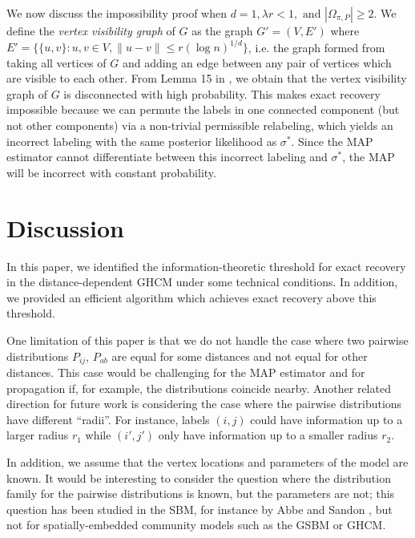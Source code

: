 \documentclass{article}
\newcommand{\1}{\mathbbm{1}}
\theoremstyle{definition}
\theoremstyle{plain}
\begin{document}
We now discuss the impossibility proof when $d = 1, \lambda r < 1, \text{ and } |\Omega_{\pi, P}| \geq 2$. We define the \textit{vertex visibility graph} of $G$ as the graph $G' = (V, E')$ where $E' = \{\{u, v\}: u,v \in V, \|u - v\| \leq r(\log n)^{1/d} \}$, i.e. the graph formed from taking all vertices of $G$ and adding an edge between any pair of vertices which are visible to each other. From Lemma 15 in \cite{GaudioJin2025}, we obtain that the vertex visibility graph of $G$ is disconnected with high probability. This makes exact recovery impossible because we can permute the labels in one connected component (but not other components) via a non-trivial permissible relabeling, which yields an incorrect labeling with the same posterior likelihood as $\sigma^*$. Since the MAP estimator cannot differentiate between this incorrect labeling and $\sigma^*$, the MAP will be incorrect with constant probability.

\section{Discussion}
\label{sec:discussion}
In this paper, we identified the information-theoretic threshold for exact recovery in the distance-dependent GHCM under some technical conditions. In addition, we provided an efficient algorithm which achieves exact recovery above this threshold.

One limitation of this paper is that we do not handle the case where two pairwise distributions $P_{ij}$, $P_{ab}$ are equal for some distances and not equal for other distances. This case would be challenging for the MAP estimator and for propagation if, for example, the distributions coincide nearby.
Another related direction for future work is considering the case where the pairwise distributions have different ``radii''. For instance, labels $(i, j)$ could have information up to a larger radius $r_1$ while $(i', j')$ only have information up to a smaller radius $r_2$.

In addition, we assume that the vertex locations and parameters of the model are known. It would be interesting to consider the question where the distribution family for the pairwise distributions is known, but the parameters are not; this question has been studied in the SBM, for instance by Abbe and Sandon \cite{AbbeSandon2015b}, but not for spatially-embedded community models such as the GSBM or GHCM.



\end{document}
